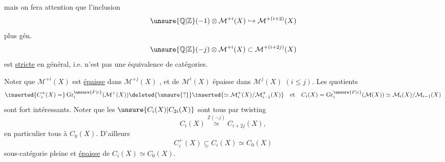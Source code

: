 mais on fera attention que l'inclusion
\[
\unsure{\mathbb{Q}|\mathbb{Z}}(-1)\otimes \mathcal{M}^{+i}(X)
\hookrightarrow \mathcal{M}^{+(i+2)}(X)
\]
plus gén.
\[
\unsure{\mathbb{Q}|\mathbb{Z}}(-j)\otimes \mathcal{M}^{+i}(X)
\subset \mathcal{M}^{+(i+2j)}(X)
\]
est \uline{stricte} en général, i.e. n'est pas
une équivalence de catégories.

Noter que $\mathcal{M}^{+i}(X)$ est \uline{épaisse} dans $\mathcal{M}^{+j}(X)$
\deleted{[elle est définie dans la catégorie}, et de
 $\mathcal{M}^i(X)$ épaisse dans $\mathcal{M}^j(X)$ $(i\leq j)$.
Les quotients
\[
\inserted{C_i^+(X)=}
\operatorname{Gr}_i^{\unsure{F|\varepsilon}}(\mathcal{M}^+(X))
\deleted{\unsure{\mathord{?}}}
\inserted{\simeq \mathcal{M}_i^+(X)/\mathcal{M}_{i-1}^+(X)}
\quad\text{et}\quad
C_i(X)=\operatorname{Gr}_i^{\unsure{F|\varepsilon}}(\mathcal{M}(X))
\simeq \mathcal{M}_i(X)/\mathcal{M}_{i-1}(X)
\]
sont fort intéressants.
Noter que les $\unsure{C_i(X)|C_{2i}(X)}$ sont tous
par twisting
\[
C_i(X)\overset{\mathbb{Z}(-j)}{\simeq}C_{i+2j}(X),
\]
en particulier tous  à $C_0(X)$.
D'ailleurs
\[
C_i^+(X)\underset{\sim}{\subset}C_i(X)\simeq C_0(X)
\]
 sous-catégorie pleine et \uline{épaisse} de
$C_i(X)\simeq C_0(X)$.
